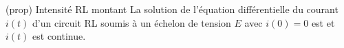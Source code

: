 \documentclass[../../main/main.tex]{subfiles}
\begin{document}
\begin{tcb*}[label=prop:isolu, sidebyside, righthand ratio=.3](prop)
  {Intensité RL montant}
	La solution de l'équation différentielle du courant $i(t)$ d'un circuit RL
	soumis à un échelon de tension $E$ avec $i(0) = 0$ est
	\psw{%
		\[
			\boxed{i(t) = \frac{E}{R}\left(1-\exp\left(-\frac{t}{\tau}\right)\right)}
		\]
	}%
  et $i(t)$ est continue.
	\vspace{-15pt}
	\tcblower
	\begin{center}
	\end{center}
\end{tcb*}
\end{document}
